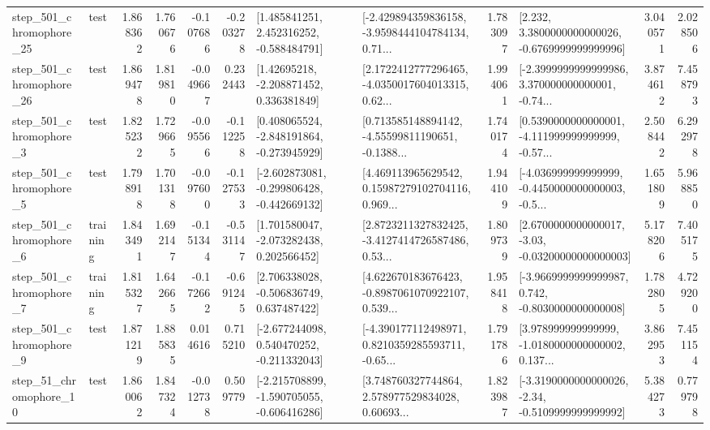 \begin{tabular}{llrrrrllrlrr}
  step\_501\_chromophore\_25 &      test &      1.868362 &    1.760676 &     -0.107686 & -0.203278 &    [1.485841251, 2.452316252, -0.588484791] &  [-2.429894359836158, -3.9598444104784134, 0.71... &       1.783097 &   [2.232, 3.3800000000000026, -0.6769999999999996] &            3.040571 &          2.028506 \\
  step\_501\_chromophore\_26 &      test &      1.869478 &    1.819810 &     -0.049667 &  0.232443 &     [1.42695218, -2.208871452, 0.336381849] &  [2.1722412777296465, -4.0350017604013315, 0.62... &       1.994061 &  [-2.3999999999999986, 3.370000000000001, -0.74... &            3.874612 &          7.458793 \\
   step\_501\_chromophore\_3 &      test &      1.825232 &    1.729665 &     -0.095566 & -0.112258 &   [0.408065524, -2.848191864, -0.273945929] &  [0.713585148894142, -4.55599811190651, -0.1388... &       1.740174 &  [0.5390000000000001, -4.111999999999999, -0.57... &            2.508442 &          6.292978 \\
   step\_501\_chromophore\_5 &      test &      1.798918 &    1.701318 &     -0.097600 & -0.127533 &  [-2.602873081, -0.299806428, -0.442669132] &  [4.469113965629542, 0.15987279102704116, 0.969... &       1.944109 &  [-4.036999999999999, -0.4450000000000003, -0.5... &            1.651809 &          5.968850 \\
   step\_501\_chromophore\_6 &  training &      1.843491 &    1.692147 &     -0.151344 & -0.531147 &    [1.701580047, -2.073282438, 0.202566452] &  [2.8723211327832425, -3.4127414726587486, 0.53... &       1.809739 &  [2.6700000000000017, -3.03, -0.03200000000000003] &            5.178206 &          7.405175 \\
   step\_501\_chromophore\_7 &  training &      1.815327 &    1.642665 &     -0.172662 & -0.691245 &    [2.706338028, -0.506836749, 0.637487422] &  [4.622670183676423, -0.8987061070922107, 0.539... &       1.958418 &  [-3.9669999999999987, 0.742, -0.8030000000000008] &            1.782805 &          4.729200 \\
   step\_501\_chromophore\_9 &      test &      1.871219 &    1.885835 &      0.014616 &  0.715210 &   [-2.677244098, 0.540470252, -0.211332043] &  [-4.390177112498971, 0.8210359285593711, -0.65... &       1.791786 &  [3.978999999999999, -1.0180000000000002, 0.137... &            3.862953 &          7.451154 \\
   step\_51\_chromophore\_10 &      test &      1.860062 &    1.847324 &     -0.012738 &  0.509779 &  [-2.215708899, -1.590705055, -0.606416286] &  [3.748760327744864, 2.578977529834028, 0.60693... &       1.823987 &  [-3.3190000000000026, -2.34, -0.5109999999999992] &            5.384273 &          0.779798 \\

\end{tabular}
